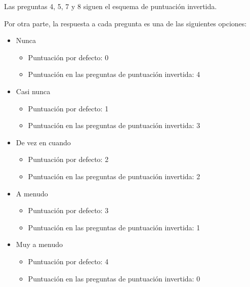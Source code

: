         Las preguntas 4, 5, 7 y 8 siguen el esquema de puntuación invertida.
        
        Por otra parte, la respuesta a cada pregunta es una de las siguientes opciones:
        \begin{itemize}
            \item Nunca
                \begin{itemize}
                    \item Puntuación por defecto: 0
                    \item Puntuación en las preguntas de puntuación invertida: 4
                \end{itemize}
            \item Casi nunca
                \begin{itemize}
                    \item Puntuación por defecto: 1
                    \item Puntuación en las preguntas de puntuación invertida: 3
                \end{itemize}
            \item De vez en cuando
                \begin{itemize}
                    \item Puntuación por defecto: 2
                    \item Puntuación en las preguntas de puntuación invertida: 2
                \end{itemize}
            \item A menudo
                \begin{itemize}
                    \item Puntuación por defecto: 3
                    \item Puntuación en las preguntas de puntuación invertida: 1
                \end{itemize}
            \item Muy a menudo
                \begin{itemize}
                    \item Puntuación por defecto: 4
                    \item Puntuación en las preguntas de puntuación invertida: 0
                \end{itemize}
        \end{itemize}

